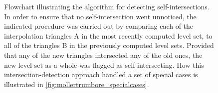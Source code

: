 \begin{figure}[htpb]
    \centering
    \resizebox{0.9\linewidth}{!}{}
    \caption[Flowchart illustrating the algorithm for detecting
    self-intersections]
    {Flowchart illustrating the algorithm for detecting self-intersections.
        In order to ensure that no self-intersection went unnoticed, the
        indicated procedure was carried out by comparing each of the
        interpolation triangles A in the most recently computed level set,
        to all of the triangles B in the previously computed level sets.
        Provided that any of the new triangles intersected any of the old ones,
        the new level set as a whole was flagged as self-intersecting. How
        this intersection-detection approach handled a set of special cases
        is illustrated in \cref{fig:mollertrumbore_specialcases}.
    }
    \label{fig:intersection_flowchart}
\end{figure}
